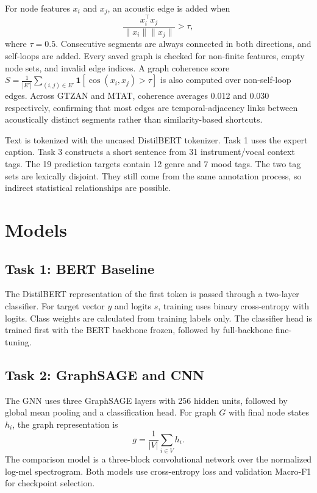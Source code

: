 \documentclass[conference]{IEEEtran}
\begin{document}
For node features $x_i$ and $x_j$, an acoustic edge is added when
\begin{equation}
  \frac{x_i^\top x_j}{\lVert x_i\rVert\lVert x_j\rVert} > \tau,
\end{equation}
where $\tau=0.5$. Consecutive segments are always connected in both directions, and self-loops
are added. Every saved graph is checked for non-finite features, empty node sets, and invalid
edge indices. A graph coherence score $S=\frac{1}{|E'|}\sum_{(i,j)\in E'}\mathbf{1}[\cos(x_i,x_j)>\tau]$
is also computed over non-self-loop edges. Across GTZAN and MTAT, coherence averages 0.012 and
0.030 respectively, confirming that most edges are temporal-adjacency links between acoustically
distinct segments rather than similarity-based shortcuts.

Text is tokenized with the uncased DistilBERT tokenizer. Task 1 uses the expert caption. Task 3
constructs a short sentence from 31 instrument/vocal context tags. The 19 prediction targets
contain 12 genre and 7 mood tags. The two tag sets are lexically disjoint. They still come from
the same annotation process, so indirect statistical relationships are possible.

\section{Models}
\subsection{Task 1: BERT Baseline}
The DistilBERT representation of the first token is passed through a two-layer classifier. For
target vector $y$ and logits $s$, training uses binary cross-entropy with logits. Class weights
are calculated from training labels only. The classifier head is trained first with the BERT
backbone frozen, followed by full-backbone fine-tuning.

\subsection{Task 2: GraphSAGE and CNN}
The GNN uses three GraphSAGE layers with 256 hidden units, followed by global mean pooling and a classification head.
For graph $G$ with final node states $h_i$, the graph representation is
\begin{equation}
  g=\frac{1}{|V|}\sum_{i\in V}h_i.
\end{equation}
The comparison model is a three-block convolutional network over the normalized log-mel
spectrogram. Both models use cross-entropy loss and validation Macro-F1 for checkpoint selection.
\end{document}
